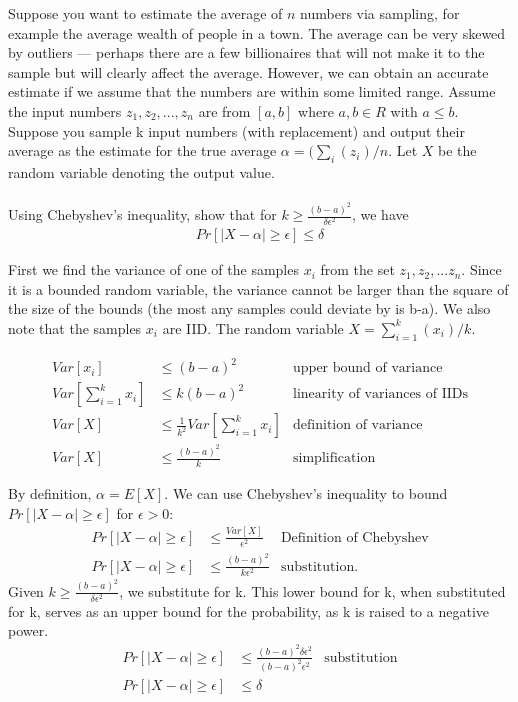 \documentclass[11pt]{article}
\begin{document}



Suppose you want to estimate the average of $n$ numbers via sampling, for example the average wealth of people in a town. The average can be very skewed by outliers — perhaps there are a few billionaires that will not make
it to the sample but will clearly affect the average. However, we can obtain an accurate estimate if we assume that the numbers are within some limited range. Assume the input numbers $z_1, z_2, . . . , z_n$ are from $[a, b]$ where $a, b \in R$ with $a \leq b$. Suppose you sample k input numbers (with replacement) and output their average as the estimate for the true average $\alpha = (\sum_i
(z_i)/n$. Let $X$ be the random variable denoting the output value. \\  \\
Using Chebyshev’s inequality, show that for $k \geq \frac{(b-a)^2}{\delta \epsilon^2}$, we have
\begin{align*}
Pr[|X-\alpha| \geq \epsilon] \leq \delta
\end{align*}

\begin{solution}
First we find the variance of one of the samples $x_i$ from the set $z_1, z_2, ...z_n$. Since it is a bounded random variable, the variance cannot be larger than the square of the size of the bounds (the most any samples could deviate by is b-a). We also note that the samples $x_i$ are IID. The random variable $X=\sum_{i=1}^{k}(x_i)/k$.

\begin{align*}
Var[x_i]&\leq  (b-a)^2  & \text{upper bound of variance} \\
Var[\sum_{i=1}^{k}x_i]&\leq  k(b-a)^2 & \text{linearity of variances of IIDs}\\
Var[X]&\leq  \frac{1}{k^2}Var[\sum_{i=1}^{k}x_i] & \text{definition of variance}\\
Var[X]&\leq  \frac{(b-a)^2}{k} & \text{simplification}
\end{align*}

By definition, $\alpha=E[X]$. We can use Chebyshev's inequality to bound $Pr[|X-\alpha| \geq \epsilon]$ for $\epsilon>0$:
\begin{align*}
Pr[|X-\alpha| \geq \epsilon] &\leq \frac{Var[X]}{\epsilon^2} & \text{Definition of Chebyshev} \\
Pr[|X-\alpha| \geq \epsilon] &\leq \frac{(b-a)^2}{k\epsilon^2} & \text{substitution}. 
\end{align*} 
Given $k \geq \frac{(b-a)^2}{\delta \epsilon^2}$, we substitute for k. This lower bound for k, when substituted for k, serves as an upper bound for the probability, as k is raised to a negative power.
\begin{align*}
Pr[|X-\alpha| \geq \epsilon] &\leq \frac{(b-a)^2 \delta \epsilon^2}{(b-a)^2 \epsilon^2} & \text{substitution} \\
Pr[|X-\alpha| \geq \epsilon] &\leq \delta
\end{align*} 
\end{solution}
\clearpage
{}
\end{document}
